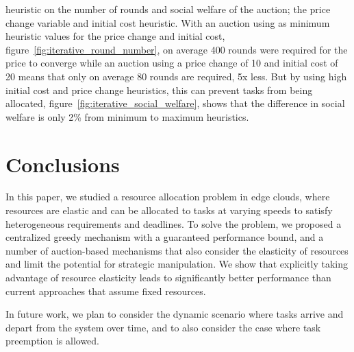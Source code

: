 heuristic on the number of rounds and social welfare of the auction; the price change variable and initial cost
heuristic. With an auction using as minimum heuristic values for the price change and initial cost,
figure~\ref{fig:iterative_round_number}, on average 400 rounds were required for the price to converge while an auction
using a price change of 10 and initial cost of 20 means that only on average 80 rounds are required, 5x less. But by
using high initial cost and price change heuristics, this can prevent tasks from being allocated,
figure~\ref{fig:iterative_social_welfare}, shows that the difference in social welfare is only 2\% from minimum to
maximum heuristics.


\section{Conclusions}\label{sec:conclusions-and-future-work}
In this paper, we studied a resource allocation problem in edge clouds, where resources are elastic and can be
allocated to tasks at varying speeds to satisfy heterogeneous requirements and deadlines. To solve the problem,
we proposed a centralized greedy mechanism with a guaranteed performance bound,  and a number of auction-based
mechanisms that also consider the elasticity of resources and limit the potential for strategic manipulation. We show
that explicitly taking advantage of resource elasticity leads to  significantly better performance than current
approaches that assume fixed resources.

In future work, we plan to consider the dynamic scenario where tasks arrive and depart from the system over time, and
to also consider the case where task preemption is allowed.


